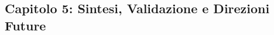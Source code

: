 \subsection{\texorpdfstring{\textbf{Capitolo 5: Sintesi, Validazione e Direzioni Future}}{1.6.4 - Capitolo 5: Sintesi, Validazione e Direzioni Future}}

\label{ssec:struttura_cap5}


      
      





